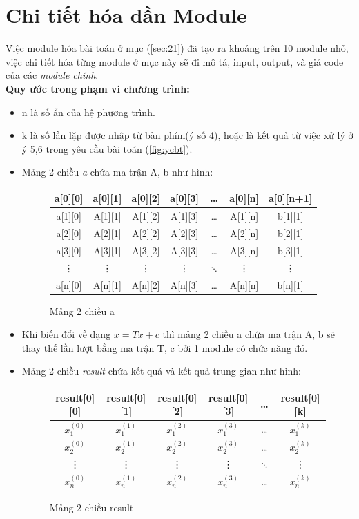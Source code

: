 \documentclass[twoside]{report2}
\begin{document}
\section{Chi tiết hóa dần Module}
Việc module hóa bài toán ở mục (\ref{sec:21}) đã tạo ra khoảng trên 10 module nhỏ, việc chi tiết hóa từng module ở mục này sẽ đi mô tả, input, output, và giả code của các \emph{module chính}.\\

\textbf{Quy ước trong phạm vi chương trình:}
\begin{itemize}
	\item n là số ẩn của hệ phương trình.
	\item k là số lần lặp được nhập từ bàn phím(ý số 4), hoặc là kết quả từ việc xử lý ở ý 5,6 trong yêu cầu bài toán (\ref{fig:ycbt}).
	\item Mảng 2 chiều \emph{a} chứa ma trận A, b như hình:
		\begin{figure}[h]
		\centering
		\begin{tabular}{c||c|c|c|c|c|c} 
		a[0][0] & a[0][1] & a[0][2] & a[0][3] & \ldots & a[0][n] & a[0][n+1] \\[0.5cm]
		\hline 
		\hline
		a[1][0] & A[1][1] & A[1][2] & A[1][3] & \ldots & A[1][n] & b[1][1] \\ [0.5cm]
		\hline 
		a[2][0] & A[2][1] & A[2][2] & A[2][3] & \ldots & A[2][n] & b[2][1] \\ [0.5cm]
		\hline 
		a[3][0] & A[3][1] & A[3][2] & A[3][3] & \ldots & A[3][n] & b[3][1] \\ [0.5cm]
		\hline 
		\vdots  & \vdots  & \vdots & \vdots & $\ddots$ & \vdots & \vdots \\ [0.2cm]
		\hline 
		a[n][0] & A[n][1] & A[n][2] & A[n][3] & \ldots & A[n][n] & b[n][1] \\ 
		\end{tabular} 
		\caption{Mảng 2 chiều a}
		\end{figure}
	\item Khi biến đổi về dạng $x = Tx + c$ thì mảng 2 chiều a chứa ma trận A, b sẽ thay thế lần lượt bằng ma trận T, c bởi 1 module có chức năng đó.
	\item Mảng 2 chiều \emph{result} chứa kết quả và kết quả trung gian như hình:
	\begin{figure}[h]
		\centering
		\begin{tabular}{c|c|c|c|c|c} 
		result[0][0] & result[0][1] & result[0][2] & result[0][3] & \ldots & result[0][k] \\
		\hline 
		\hline
		$x_1^{(0)}$ & $x_1^{(1)}$ & $x_1^{(2)}$ & $x_1^{(3)}$ & \ldots & $x_1^{(k)}$  \\
		\hline 
		$x_2^{(0)}$ & $x_2^{(1)}$ & $x_2^{(2)}$ & $x_2^{(3)}$ & \ldots & $x_2^{(k)}$ \\
		\hline 
		\vdots  & \vdots  & \vdots & \vdots & $\ddots$ & \vdots \\ 
		\hline 
		$x_n^{(0)}$ & $x_n^{(1)}$ & $x_n^{(2)}$ & $x_n^{(3)}$ & \ldots & $x_n^{(k)}$ \\ 
		\end{tabular} 
		\caption{Mảng 2 chiều result}
		\end{figure}
	
\end{itemize}
\end{document}
